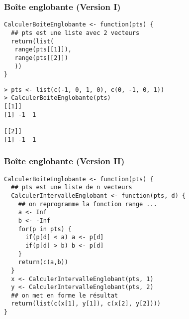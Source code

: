 \documentclass[10pt]{beamer}
\begin{document}
\begin{frame}[fragile]
  \frametitle{Boîte englobante (Version I)}


  \begin{lstlisting}[style=editor]
CalculerBoiteEnglobante <- function(pts) {
  ## pts est une liste avec 2 vecteurs
  return(list(
   range(pts[[1]]),
   range(pts[[2]])
   ))
}
  \end{lstlisting}


  \begin{lstlisting}
> pts <- list(c(-1, 0, 1, 0), c(0, -1, 0, 1))
> CalculerBoiteEnglobante(pts)
[[1]]
[1] -1  1

[[2]]
[1] -1  1
  \end{lstlisting}

\end{frame}


\begin{frame}[fragile]
  \frametitle{Boîte englobante (Version II)}


  \begin{lstlisting}[style=editor]
CalculerBoiteEnglobante <- function(pts) {
  ## pts est une liste de n vecteurs
  CalculerIntervalleEnglobant <- function(pts, d) {
    ## on reprogramme la fonction range ...
    a <- Inf
    b <- -Inf
    for(p in pts) {
      if(p[d] < a) a <- p[d]
      if(p[d] > b) b <- p[d]
    }
    return(c(a,b))
  }
  x <- CalculerIntervalleEnglobant(pts, 1)
  y <- CalculerIntervalleEnglobant(pts, 2)
  ## on met en forme le résultat
  return(list(c(x[1], y[1]), c(x[2], y[2])))
}
  \end{lstlisting}

\end{frame}


\questionSlide

 \appendix
 \backupSlides

\end{document}
